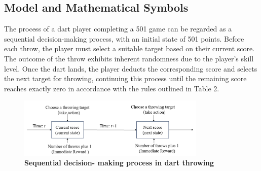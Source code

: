 \documentclass[cjjs]{ipart}
\theoremstyle{plain}
\begin{document}
\begin{table}[h]
    \centering
    \caption{\textbf{The fundamental rules of the 501 dart game.}}
    \label{tab:rules}
\end{table}
\newpage
\subsection{Model and Mathematical Symbols}
The process of a dart player completing a 501 game can be regarded as a sequential decision-making process, with an initial state of 501 points. Before each throw, the player must select a suitable target based on their current score. The outcome of the throw exhibits inherent randomness due to the player's skill level. Once the dart lands, the player deducts the corresponding score and selects the next target for throwing, continuing this process until the remaining score reaches exactly zero in accordance with the rules outlined in Table 2.

\begin{figure}[h]
    \centering
    \includegraphics[width=0.80\textwidth]{2.png} 
    \caption{\textbf{Sequential decision-
making process in dart throwing}}
    \label{fig:dartboard}
\end{figure}
\end{document}
